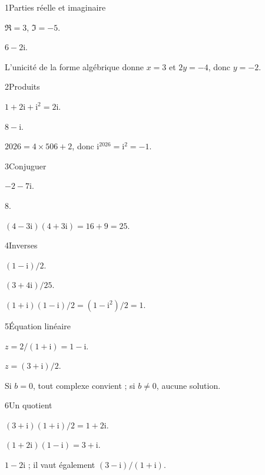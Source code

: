 \begin{corrige}{1}{Parties réelle et imaginaire}
\begin{questions}
\item $\Re=3$, $\Im=-5$.
\item $6-2\mathrm i$.
\item L’unicité de la forme algébrique donne $x=3$ et $2y=-4$, donc $y=-2$.
\end{questions}
\end{corrige}
\begin{corrige}{2}{Produits}
\begin{questions}
\item $1+2\mathrm i+\mathrm i^2=2\mathrm i$.
\item $8-\mathrm i$.
\item $2026=4\times506+2$, donc $\mathrm i^{2026}=\mathrm i^2=-1$.
\end{questions}
\end{corrige}
\begin{corrige}{3}{Conjuguer}
\begin{questions}
\item $-2-7\mathrm i$.
\item $8$.
\item $(4-3\mathrm i)(4+3\mathrm i)=16+9=25$.
\end{questions}
\end{corrige}
\begin{corrige}{4}{Inverses}
\begin{questions}
\item $(1-\mathrm i)/2$.
\item $(3+4\mathrm i)/25$.
\item $(1+\mathrm i)(1-\mathrm i)/2=(1-\mathrm i^2)/2=1$.
\end{questions}
\end{corrige}
\begin{corrige}{5}{Équation linéaire}
\begin{questions}
\item $z=2/(1+\mathrm i)=1-\mathrm i$.
\item $z=(3+\mathrm i)/2$.
\item Si $b=0$, tout complexe convient ; si $b\ne0$, aucune solution.
\end{questions}
\end{corrige}
\begin{corrige}{6}{Un quotient}
\begin{questions}
\item $(3+\mathrm i)(1+\mathrm i)/2=1+2\mathrm i$.
\item $(1+2\mathrm i)(1-\mathrm i)=3+\mathrm i$.
\item $1-2\mathrm i$ ; il vaut également $(3-\mathrm i)/(1+\mathrm i)$.
\end{questions}
\end{corrige}
